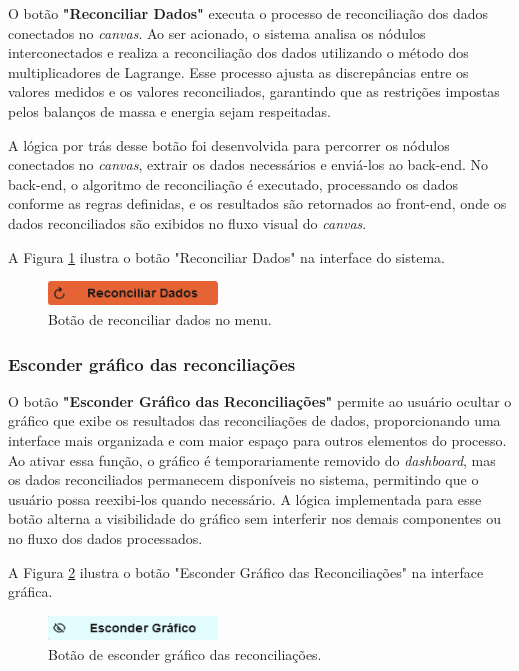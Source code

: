 O botão \textbf{"Reconciliar Dados"} executa o processo de reconciliação dos dados conectados no \textit{canvas}. Ao ser acionado, o sistema analisa os nódulos interconectados e realiza a reconciliação dos dados utilizando o método dos multiplicadores de Lagrange. Esse processo ajusta as discrepâncias entre os valores medidos e os valores reconciliados, garantindo que as restrições impostas pelos balanços de massa e energia sejam respeitadas.

A lógica por trás desse botão foi desenvolvida para percorrer os nódulos conectados no \textit{canvas}, extrair os dados necessários e enviá-los ao back-end. No back-end, o algoritmo de reconciliação é executado, processando os dados conforme as regras definidas, e os resultados são retornados ao front-end, onde os dados reconciliados são exibidos no fluxo visual do \textit{canvas}.

A Figura \ref{Fig:ReconcileButton} ilustra o botão "Reconciliar Dados" na interface do sistema.

\begin{figure}[htbp]
    \centering
    \includegraphics[width=0.4\textwidth]{figuras/reconcile-data-button.png}
    \caption{Botão de reconciliar dados no menu.}
    \label{Fig:ReconcileButton}
\end{figure}

\subsubsection{Esconder gráfico das reconciliações}

O botão \textbf{"Esconder Gráfico das Reconciliações"} permite ao usuário ocultar o gráfico que exibe os resultados das reconciliações de dados, proporcionando uma interface mais organizada e com maior espaço para outros elementos do processo. Ao ativar essa função, o gráfico é temporariamente removido do \textit{dashboard}, mas os dados reconciliados permanecem disponíveis no sistema, permitindo que o usuário possa reexibi-los quando necessário. A lógica implementada para esse botão alterna a visibilidade do gráfico sem interferir nos demais componentes ou no fluxo dos dados processados.

A Figura \ref{Fig:HideGraphButton} ilustra o botão "Esconder Gráfico das Reconciliações" na interface gráfica.

\begin{figure}[htbp]
    \centering
    \includegraphics[width=0.4\textwidth]{figuras/hide-graphbar-button.png}
    \caption{Botão de esconder gráfico das reconciliações.}
    \label{Fig:HideGraphButton}
\end{figure}

